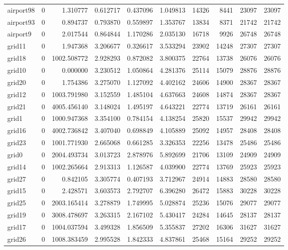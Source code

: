 \begin{longtable}{|l|r|r|r|r|r|r|r|r|r|}
airport98 & 0 & 1.310777 & 0.612717 & 0.437096 & 1.049813 & 14326 & 8441 & 23097 & 23097 \\
airport93 & 0 & 0.894737 & 0.793870 & 0.559897 & 1.353767 & 13834 & 8371 & 21742 & 21742 \\
airport9 & 0 & 2.017544 & 0.864844 & 1.170286 & 2.035130 & 16718 & 9926 & 26748 & 26748 \\
grid11 & 0 & 1.947368 & 3.206677 & 0.326617 & 3.533294 & 23902 & 14248 & 27307 & 27307 \\
grid18 & 0 & 1002.508772 & 2.928293 & 0.872082 & 3.800375 & 22764 & 13738 & 26076 & 26076 \\
grid10 & 0 & 0.000000 & 3.230512 & 1.050864 & 4.281376 & 25114 & 15079 & 28876 & 28876 \\
grid20 & 0 & 1.754386 & 3.275070 & 1.127092 & 4.402162 & 24606 & 14900 & 28367 & 28367 \\
grid12 & 0 & 1003.791980 & 3.152559 & 1.485104 & 4.637663 & 24608 & 14874 & 28367 & 28367 \\
grid21 & 0 & 4005.456140 & 3.148024 & 1.495197 & 4.643221 & 22774 & 13719 & 26161 & 26161 \\
grid1 & 0 & 1000.947368 & 3.354100 & 0.784154 & 4.138254 & 25820 & 15537 & 29942 & 29942 \\
grid16 & 0 & 4002.736842 & 3.407040 & 0.698849 & 4.105889 & 25092 & 14957 & 28408 & 28408 \\
grid23 & 0 & 1001.771930 & 2.665068 & 0.661285 & 3.326353 & 22256 & 13478 & 25486 & 25486 \\
grid0 & 0 & 2004.493734 & 3.013723 & 2.878976 & 5.892699 & 21706 & 13109 & 24909 & 24909 \\
grid14 & 0 & 1002.265664 & 2.913313 & 1.126587 & 4.039900 & 22774 & 13769 & 25923 & 25923 \\
grid27 & 0 & 0.842105 & 3.305774 & 0.407193 & 3.712967 & 24914 & 14883 & 28580 & 28580 \\
grid15 & 0 & 2.428571 & 3.603573 & 2.792707 & 6.396280 & 26472 & 15883 & 30228 & 30228 \\
grid25 & 0 & 2003.165414 & 3.278879 & 1.749995 & 5.028874 & 25236 & 15076 & 29077 & 29077 \\
grid19 & 0 & 3008.478697 & 3.263315 & 2.167102 & 5.430417 & 24284 & 14645 & 28137 & 28137 \\
grid17 & 0 & 1004.037594 & 3.499328 & 1.856509 & 5.355837 & 27202 & 16306 & 31627 & 31627 \\
grid26 & 0 & 1008.383459 & 2.995528 & 1.842333 & 4.837861 & 25468 & 15164 & 29252 & 29252 \\

\end{longtable}

